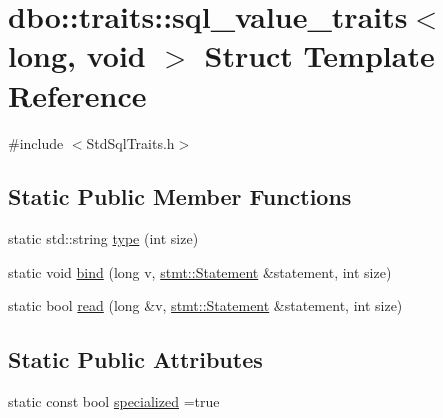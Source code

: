\hypertarget{structdbo_1_1traits_1_1sql__value__traits_3_01long_00_01void_01_4}{\section{dbo\+:\+:traits\+:\+:sql\+\_\+value\+\_\+traits$<$ long, void $>$ Struct Template Reference}
\label{structdbo_1_1traits_1_1sql__value__traits_3_01long_00_01void_01_4}
}


{\ttfamily \#include $<$Std\+Sql\+Traits.\+h$>$}

\subsection*{Static Public Member Functions}
\begin{DoxyCompactItemize}
\item 
static std\+::string \hyperlink{structdbo_1_1traits_1_1sql__value__traits_3_01long_00_01void_01_4_a45c06ff3f1562386293a5fc953a458f2}{type} (int size)
\item 
static void \hyperlink{structdbo_1_1traits_1_1sql__value__traits_3_01long_00_01void_01_4_a0e20de466f7716d430ecdf55a1bfb345}{bind} (long v, \hyperlink{classdbo_1_1stmt_1_1_statement}{stmt\+::\+Statement} \&statement, int size)
\item 
static bool \hyperlink{structdbo_1_1traits_1_1sql__value__traits_3_01long_00_01void_01_4_a6ecadd57f3d8bdf025028bcb3be9d048}{read} (long \&v, \hyperlink{classdbo_1_1stmt_1_1_statement}{stmt\+::\+Statement} \&statement, int size)
\end{DoxyCompactItemize}
\subsection*{Static Public Attributes}
\begin{DoxyCompactItemize}
\item 
static const bool \hyperlink{structdbo_1_1traits_1_1sql__value__traits_3_01long_00_01void_01_4_a5cdf7ca5fefd9b06e2afff8c1f981cd4}{specialized} =true
\end{DoxyCompactItemize}


